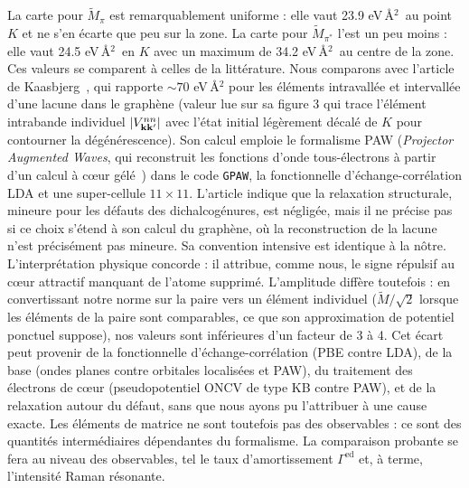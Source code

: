 La carte pour $\tilde M_\pi$ est remarquablement uniforme : elle vaut 23.9 eV\,\AA${^2}$~au point $K$ et ne s'en écarte que peu sur la zone. La carte pour $\tilde M_{\pi^*}$ l'est un peu moins : elle vaut 24.5 eV\,\AA$^{2}$~en $K$ avec un maximum de 34.2 eV\,\AA$^2$~au centre de la zone. Ces valeurs se comparent à celles de la littérature. Nous comparons avec l'article de Kaasbjerg~\cite{kaasbjergAtomisticMatrixTheory2020}, qui rapporte $\sim 70$ eV\,\AA$^2$ pour les éléments intravallée et intervallée d'une lacune dans le graphène (valeur lue sur sa figure 3 qui trace l'élément intrabande individuel $|V_{\mathbf{k}\mathbf{k}'}^{nn}|$ avec l'état initial légèrement décalé de $K$ pour contourner la dégénérescence). Son calcul emploie le formalisme PAW (\textit{Projector Augmented Waves}, qui reconstruit les fonctions d'onde tous-électrons à partir d'un calcul à cœur gélé~\cite{blochlProjectorAugmentedwaveMethod1994}) dans le code \texttt{GPAW}, la fonctionnelle d'échange-corrélation LDA et une super-cellule $11\times 11$. L'article indique que la relaxation structurale, mineure pour les défauts des dichalcogénures, est négligée, mais il ne précise pas si ce choix s'étend à son calcul du graphène, où la reconstruction de la lacune n'est précisément pas mineure. Sa convention intensive est identique à la nôtre. L'interprétation physique concorde : il attribue, comme nous, le signe répulsif au cœur attractif manquant de l'atome supprimé. L'amplitude diffère toutefois : en convertissant notre norme sur la paire vers un élément individuel ($\tilde M/\sqrt{2}$ lorsque les éléments de la paire sont comparables, ce que son approximation de potentiel ponctuel suppose), nos valeurs sont inférieures d'un facteur de 3 à 4. Cet écart peut provenir de la fonctionnelle d'échange-corrélation (PBE contre LDA), de la base (ondes planes contre orbitales localisées et PAW), du traitement des électrons de cœur (pseudopotentiel ONCV de type KB contre PAW), et de la relaxation autour du défaut, sans que nous ayons pu l'attribuer à une cause exacte. Les éléments de matrice ne sont toutefois pas des observables : ce sont des quantités intermédiaires dépendantes du formalisme. La comparaison probante se fera au niveau des observables, tel le taux d'amortissement $\Gamma^\text{ed}$ et, à terme, l'intensité Raman résonante.


